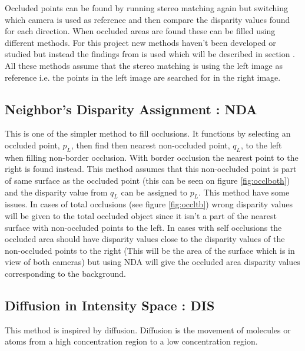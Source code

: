Occluded points can be found by running stereo matching again but switching which camera is used as reference and then compare the disparity values found for each direction. When occluded areas are found these can be filled using different methods. For this project new methods haven't been developed or studied but instead the findings from \cite{huq2013occlusion} is used which will be described in section . All these methods assume that the stereo matching is using the left image as reference i.e. the points in the left image are searched for in the right image. 

\subsection{Neighbor's Disparity Assignment : NDA}\label{sec:nda}
This is one of the simpler method to fill occlusions. It functions by selecting an occluded point, $p_L$, then find then nearest non-occluded point, $q_L$, to the left when filling non-border occlusion. With border occlusion the nearest point to the right is found instead. This method assumes that this non-occluded point is part of same surface as the occluded point (this can be seen on figure \vref{fig:occlboth}) and the disparity value from $q_L$ can be assigned to $p_L$. This method have some issues. In cases of total occlusions (see figure \vref{fig:occltb}) wrong disparity values will be given to the total occluded object since it isn't a part of the nearest surface with non-occluded points to the left. In cases with self occlusions the occluded area should have disparity values close to the disparity values of the non-occluded points to the right (This will be the area of the surface which is in view of both cameras) but using NDA will give the occluded area disparity values corresponding to the background.

\subsection{Diffusion in Intensity Space : DIS}
This method is inspired by diffusion. Diffusion is the movement of molecules or atoms from a high concentration region to a low concentration region. \\

